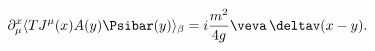 \begin{equation}
\label{eq:wtzwei}
\partial^x_\mu\langle T J^\mu(x)A(y)\Psibar(y)\rangle_\beta 
=i\frac{m^2}{4g}\veva\,\deltav(x-y).
\end{equation}

